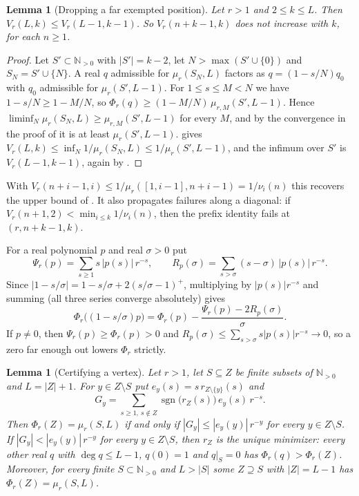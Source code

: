 \documentclass[11pt]{article}
\newtheorem{lemma}[theorem]{Lemma}
\newcommand{\N}{\mathbb N}
\DeclareMathOperator{\sgn}{sgn}
\begin{document}
\begin{lemma}[Dropping a far exempted position]\label{lem:rowmono}
Let $r>1$ and $2\le k\le L$.  Then $V_r(L,k)\le V_r(L-1,k-1)$.  So
$V_r(n+k-1,k)$ does not increase with $k$, for each $n\ge1$.
\end{lemma}

\begin{proof}
Let $S'\subset\N_{>0}$ with $|S'|=k-2$, let $N>\max(S'\cup\{0\})$ and
$S_N=S'\cup\{N\}$.  A real $q$ admissible for $\mu_r(S_N,L)$ factors as
$q=(1-s/N)q_0$ with $q_0$ admissible for $\mu_r(S',L-1)$.  For
$1\le s\le M<N$ we have $1-s/N\ge1-M/N$, so
$\Phi_r(q)\ge(1-M/N)\,\mu_{r,M}(S',L-1)$.  Hence
$\liminf_N\mu_r(S_N,L)\ge\mu_{r,M}(S',L-1)$ for every $M$, and by the
convergence in the proof of \cite[Proposition~2.1(b)]{coefficient-mass-rows} it is at
least $\mu_r(S',L-1)$.  \cite[Proposition~2.1(b)]{coefficient-mass-rows} gives
$V_r(L,k)\le\inf_N1/\mu_r(S_N,L)\le1/\mu_r(S',L-1)$, and the infimum over
$S'$ is $V_r(L-1,k-1)$, again by \cite[Proposition~2.1(b)]{coefficient-mass-rows}.
\end{proof}

With $V_r(n+i-1,i)\le1/\mu_r([1,i-1],n+i-1)=1/\nu_i(n)$ this recovers the
upper bound of \cite[Theorem~3.3]{coefficient-mass-rows}.  It also propagates failures
along a diagonal: if $V_r(n+1,2)<\min_{i\le k}1/\nu_i(n)$, then the prefix
identity fails at $(r,n+k-1,k)$.

For a real polynomial $p$ and real $\sigma>0$ put
\[
  \Psi_r(p)=\sum_{s\ge1}s\,|p(s)|\,r^{-s},\qquad
  R_p(\sigma)=\sum_{s>\sigma}(s-\sigma)\,|p(s)|\,r^{-s}.
\]
Since $|1-s/\sigma|=1-s/\sigma+2(s/\sigma-1)^+$, multiplying by
$|p(s)|r^{-s}$ and summing (all three series converge absolutely) gives
\[
  \Phi_r\bigl((1-s/\sigma)p\bigr)=\Phi_r(p)-\frac{\Psi_r(p)-2R_p(\sigma)}\sigma .
\]
If $p\ne0$, then $\Psi_r(p)\ge\Phi_r(p)>0$ and
$R_p(\sigma)\le\sum_{s>\sigma}s|p(s)|r^{-s}\to0$, so a zero far enough out
lowers $\Phi_r$ strictly.

\begin{lemma}[Certifying a vertex]\label{lem:vertexopt}
Let $r>1$, let $S\subseteq Z$ be finite subsets of $\N_{>0}$ and
$L=|Z|+1$.  For $y\in Z\setminus S$ put $e_y(s)=s\,r_{Z\setminus\{y\}}(s)$
and
\[
  G_y=\sum_{s\ge1,\ s\notin Z}\sgn\bigl(r_Z(s)\bigr)\,e_y(s)\,r^{-s}.
\]
Then $\Phi_r(Z)=\mu_r(S,L)$ if and only if $|G_y|\le|e_y(y)|\,r^{-y}$ for
every $y\in Z\setminus S$.  If $|G_y|<|e_y(y)|\,r^{-y}$ for every
$y\in Z\setminus S$, then $r_Z$ is the unique minimizer: every other real
$q$ with $\deg q\le L-1$, $q(0)=1$ and $q|_S=0$ has
$\Phi_r(q)>\Phi_r(Z)$.  Moreover, for every finite
$S\subset\N_{>0}$ and $L>|S|$ some $Z\supseteq S$ with $|Z|=L-1$ has
$\Phi_r(Z)=\mu_r(S,L)$.
\end{lemma}
\end{document}
